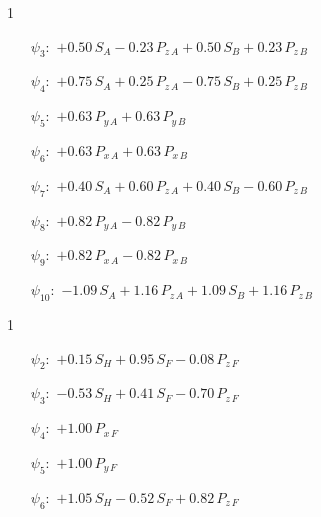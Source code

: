 \begin{questionBox}1{}
    \begin{itemize}
        \item[\(\psi_3:\)]
            \(
            +   0.50\,S_A
            -   0.23\,P_{z\,A}
            +   0.50\,S_B
            +   0.23\,P_{z\,B}
            \)
        \item[\(\psi_4:\)]
            \(
            +   0.75\,S_A
            +   0.25\,P_{z\,A}
            -   0.75\,S_B
            +   0.25\,P_{z\,B}
            \)
        \item[\(\psi_5:\)]
            \(
            +   0.63\,P_{y\,A}
            +   0.63\,P_{y\,B}
            \)
        \item[\(\psi_6:\)]
            \(
            +   0.63\,P_{x\,A}
            +   0.63\,P_{x\,B}
            \)
        \item[\(\psi_7:\)]
            \(
            +   0.40\,S_A
            +   0.60\,P_{z\,A}
            +   0.40\,S_B
            -   0.60\,P_{z\,B}
            \)
        \item[\(\psi_8:\)]
            \(
            +   0.82\,P_{y\,A}
            -   0.82\,P_{y\,B}
            \)
        \item[\(\psi_9:\)]
            \(
            +   0.82\,P_{x\,A}
            -   0.82\,P_{x\,B}
            \)
        \item[\(\psi_{10}:\)]
            \(
            -   1.09\,S_A
            +   1.16\,P_{z\,A}
            +   1.09\,S_B
            +   1.16\,P_{z\,B}
            \)
    \end{itemize}
\end{questionBox}


\begin{questionBox}1{}
    \begin{itemize}
        \item[\(\psi_2:\)]
            \(
            +   0.15\,S_H
            +   0.95\,S_F
            -   0.08\,P_{z\,F}
            \)
        \item[\(\psi_3:\)]
            \(
            -   0.53\,S_H
            +   0.41\,S_F
            -   0.70\,P_{z\,F}
            \)
        \item[\(\psi_4:\)]
            \(
            +   1.00\,P_{x\,F}
            \)
        \item[\(\psi_5:\)]
            \(
            +   1.00\,P_{y\,F}
            \)
        \item[\(\psi_6:\)]
            \(
            +   1.05\,S_H
            -   0.52\,S_F
            +   0.82\,P_{z\,F}
            \)
    \end{itemize}
\end{questionBox}


